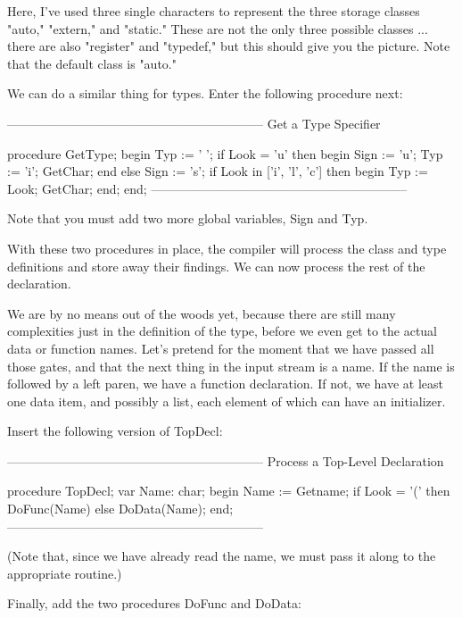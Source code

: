 \documentclass[float=false, crop=false]{standalone}
\begin{document}
Here, I've used three single characters to represent the three storage classes
"auto," "extern," and "static." These are not the only three possible classes
... there are also "register" and "typedef," but this should give you the
picture. Note that the default class is "auto."

We can do a similar thing for types. Enter the following procedure next:

\begin{code}
{--------------------------------------------------------------}
{  Get a Type Specifier }

procedure GetType;
begin
   Typ := ' ';
   if Look = 'u' then begin
      Sign := 'u';
      Typ := 'i';
      GetChar;
      end
   else Sign := 's';
   if Look in ['i', 'l', 'c'] then begin
      Typ := Look;
      GetChar;
   end;
end;
{--------------------------------------------------------------}
\end{code}

Note that you must add two more global variables, Sign and Typ.

With these two procedures in place, the compiler will process the
class and type definitions and store away their findings.  We can
now process the rest of the declaration.

We  are by no means out of the woods yet, because there are still
many complexities just in the definition of the  type,  before we
even get to the actual data or function names.  Let's pretend for
the moment that we have passed all those gates, and that the next
thing in the  input stream is a name.  If the name is followed by
a left paren, we have a function declaration.  If not, we have at
least one data item,  and  possibly a list, each element of which
can have an initializer.

Insert the following version of TopDecl:

\begin{code}
{--------------------------------------------------------------}
{ Process a Top-Level Declaration }

procedure TopDecl;
var Name: char;
begin
   Name := Getname;
   if Look = '(' then
      DoFunc(Name)
   else
      DoData(Name);
end;
{--------------------------------------------------------------}
\end{code}

(Note that, since we have already read the name, we must pass it along to the
appropriate routine.)

Finally, add the two procedures DoFunc and DoData:
\end{document}
